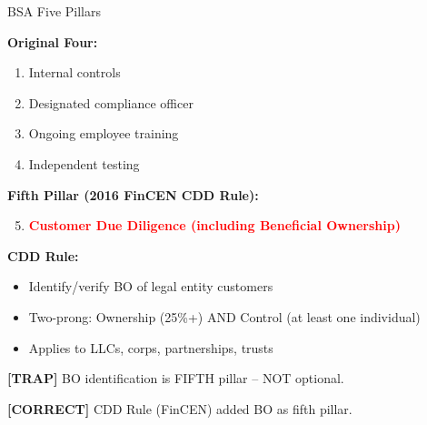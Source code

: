 \documentclass[8pt,aspectratio=169,fontsize=7pt]{beamer}
\renewcommand{\tiny}{\fontsize{4pt}{5pt}\selectfont}
\renewcommand{\normalsize}{\fontsize{8pt}{9pt}\selectfont}
\newcommand{\trap}[1]{%
	\begin{block}{\textcolor{redtrap}{\textbf{[TRAP]}}}
		\textcolor{redtrap}{\tiny #1}
	\end{block}
}
\newcommand{\correct}[1]{%
	\begin{block}{\textcolor{greencorrect}{\textbf{[CORRECT]}}}
		\textcolor{greencorrect}{\tiny #1}
	\end{block}
}
\begin{document}
	\begin{frame}{\normalsize BSA Five Pillars}
		
		\textbf{Original Four:}
		\begin{enumerate}
			\item Internal controls
			\item Designated compliance officer
			\item Ongoing employee training
			\item Independent testing
		\end{enumerate}
		
		\textbf{Fifth Pillar (2016 FinCEN CDD Rule):}
		\begin{enumerate}
			\setcounter{enumi}{4}
			\item \textcolor{red}{\textbf{Customer Due Diligence (including Beneficial Ownership)}}
		\end{enumerate}
		
		\textbf{CDD Rule:}
		\begin{itemize}
			\item Identify/verify BO of legal entity customers
			\item Two-prong: Ownership (25\%+) AND Control (at least one individual)
			\item Applies to LLCs, corps, partnerships, trusts
		\end{itemize}
		
		\trap{BO identification is FIFTH pillar -- NOT optional.}
		
		\correct{2016 CDD Rule (FinCEN) added BO as fifth pillar.}
	\end{frame}
	
\end{document}
